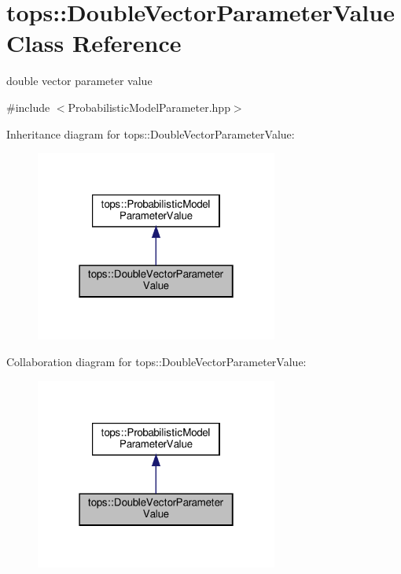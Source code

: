 \hypertarget{classtops_1_1DoubleVectorParameterValue}{}\section{tops\+:\+:Double\+Vector\+Parameter\+Value Class Reference}
\label{classtops_1_1DoubleVectorParameterValue}


double vector parameter value  




{\ttfamily \#include $<$Probabilistic\+Model\+Parameter.\+hpp$>$}



Inheritance diagram for tops\+:\+:Double\+Vector\+Parameter\+Value\+:
\nopagebreak
\begin{figure}[H]
\begin{center}
\leavevmode
\includegraphics[width=226pt]{classtops_1_1DoubleVectorParameterValue__inherit__graph}
\end{center}
\end{figure}


Collaboration diagram for tops\+:\+:Double\+Vector\+Parameter\+Value\+:
\nopagebreak
\begin{figure}[H]
\begin{center}
\leavevmode
\includegraphics[width=226pt]{classtops_1_1DoubleVectorParameterValue__coll__graph}
\end{center}
\end{figure}
